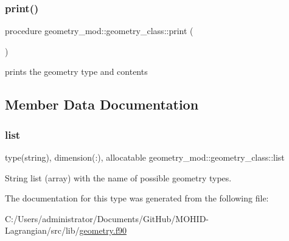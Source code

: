 \subsubsection{\texorpdfstring{print()}{print()}}
{\footnotesize\ttfamily procedure geometry\+\_\+mod\+::geometry\+\_\+class\+::print (\begin{DoxyParamCaption}{ }\end{DoxyParamCaption})\hspace{0.3cm}{\ttfamily [private]}}



prints the geometry type and contents 



\subsection{Member Data Documentation}
\mbox{\label{structgeometry__mod_1_1geometry__class_a218ff308d9bb94f4386573d7329babc6}} 
\subsubsection{\texorpdfstring{list}{list}}
{\footnotesize\ttfamily type(string), dimension(\+:), allocatable geometry\+\_\+mod\+::geometry\+\_\+class\+::list\hspace{0.3cm}{\ttfamily [private]}}



String list (array) with the name of possible geometry types. 



The documentation for this type was generated from the following file\+:\begin{DoxyCompactItemize}
\item 
C\+:/\+Users/administrator/\+Documents/\+Git\+Hub/\+M\+O\+H\+I\+D-\/\+Lagrangian/src/lib/\hyperlink{geometry_8f90}{geometry.\+f90}\end{DoxyCompactItemize}
